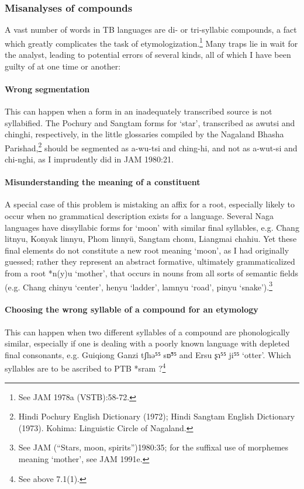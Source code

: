 \subsubsection{Misanalyses of compounds}
A vast number of words in TB languages are di- or tri-syllabic compounds, a fact which greatly complicates the task of etymologization.\footnote{See JAM 1978a (VSTB):58-72.} Many traps lie in wait for the analyst, leading to potential errors of several kinds, all of which I have been guilty of at one time or another:

\paragraph{Wrong segmentation}
This can happen when a form in an inadequately transcribed source is not syllabified. The Pochury and Sangtam forms for `star', transcribed as awutsi and chinghi, respectively, in the little glossaries compiled by the Nagaland Bhasha Parishad,\footnote{Hindi Pochury English Dictionary (1972); Hindi Sangtam English Dictionary (1973). Kohima: Linguistic Circle of Nagaland.} should be segmented as a-wu-tsi and ching-hi, and not as a-wut-si and chi-nghi, as I imprudently did in JAM 1980:21.

\paragraph{Misunderstanding the meaning of a constituent}
A special case of this problem is mistaking an affix for a root, especially likely to occur when no grammatical description exists for a language. Several Naga languages have dissyllabic forms for `moon' with similar final syllables, e.g. Chang litnyu, Konyak linnyu, Phom linnyü, Sangtam chonu, Liangmai chahiu. Yet these final elements do not constitute a new root meaning `moon', as I had originally guessed; rather they represent an abstract formative, ultimately grammaticalized from a root *n(y)u `mother', that occurs in nouns from all sorts of semantic fields (e.g. Chang chinyu `center', henyu `ladder', lamnyu `road', pinyu `snake').\footnote{See JAM (“Stars, moon, spirits”)1980:35; for the suffixal use of morphemes meaning ‘mother’, see JAM 1991e.}

\paragraph{Choosing the wrong syllable of a compound for an etymology}
This can happen when two different syllables of a compound are phonologically similar, especially if one is dealing with a poorly known language with depleted final consonants, e.g. Guiqiong Ganzi tʃhə⁵⁵ sɒ̃⁵⁵ and Ersu ʂɿ⁵⁵ ji⁵⁵ `otter'. Which syllables are to be ascribed to PTB *sram ?\footnote{See above 7.1(1).}

